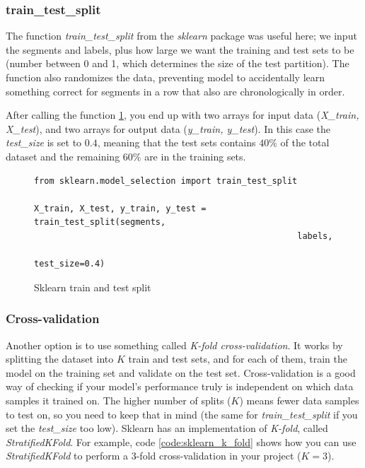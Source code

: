 \subsubsection{train\_test\_split}
The function \textit{train\_test\_split} from the \textit{sklearn} package was useful here; we input the segments and labels, plus how large we want the training and test sets to be (number between 0 and 1, which determines the size of the test partition). The function also randomizes the data, preventing model to accidentally learn something correct for segments in a row that also are chronologically in order.

After calling the function \ref{code:sklearn_train_test_split}, you end up with two arrays for input data (\textit{X\_train, X\_test}), and two arrays for output data (\textit{y\_train, y\_test}). In this case the \textit{test\_size} is set to $0.4$, meaning that the test sets contains $40\%$ of the total dataset and the remaining $60\%$ are in the training sets.

\begin{figure}
\begin{code}
    \caption{Sklearn train and test split}
    \label{code:sklearn_train_test_split}
    
    \begin{verbatim}
from sklearn.model_selection import train_test_split

X_train, X_test, y_train, y_test = train_test_split(segments, 
                                                    labels, 
                                                    test_size=0.4)
    \end{verbatim}
\end{code}
\end{figure}

\subsubsection{Cross-validation}
Another option is to use something called \textit{K-fold cross-validation}. It works by splitting the dataset into $K$ train and test sets, and for each of them, train the model on the training set and validate on the test set. Cross-validation is a good way of checking if your model's performance truly is independent on which data samples it trained on. The higher number of splits ($K$) means fewer data samples to test on, so you need to keep that in mind (the same for \textit{train\_test\_split} if you set the \textit{test\_size} too low). Sklearn has an implementation of \textit{K-fold}, called \textit{StratifiedKFold}. For example, code \ref{code:sklearn_k_fold} shows how you can use \textit{StratifiedKFold} to perform a 3-fold cross-validation in your project ($K = 3$). 

